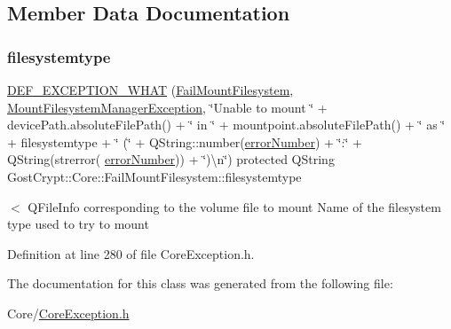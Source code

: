 \subsection{Member Data Documentation}
\mbox{\label{class_gost_crypt_1_1_core_1_1_fail_mount_filesystem_a73a764c0045dfdb4ad0f0229466b1fa0}} 
\subsubsection{\texorpdfstring{filesystemtype}{filesystemtype}}
{\footnotesize\ttfamily \hyperlink{_gost_crypt_exception_8h_a5bc1e1c6c9d6f46c84eeba49e33355f9}{D\+E\+F\+\_\+\+E\+X\+C\+E\+P\+T\+I\+O\+N\+\_\+\+W\+H\+AT} (\hyperlink{class_gost_crypt_1_1_core_1_1_fail_mount_filesystem}{Fail\+Mount\+Filesystem}, \hyperlink{class_gost_crypt_1_1_core_1_1_mount_filesystem_manager_exception}{Mount\+Filesystem\+Manager\+Exception}, \char`\"{}Unable to mount \char`\"{} + device\+Path.\+absolute\+File\+Path() + \char`\"{} in \char`\"{} + mountpoint.\+absolute\+File\+Path() + \char`\"{} as \char`\"{} + filesystemtype + \char`\"{} (\char`\"{} + Q\+String\+::number(\hyperlink{class_gost_crypt_1_1_core_1_1_mount_filesystem_manager_exception_a1fb5da5dbf91cfd3e664ffb9e2aee9ee}{error\+Number}) + \char`\"{}\+:\char`\"{} + Q\+String(strerror( \hyperlink{class_gost_crypt_1_1_core_1_1_mount_filesystem_manager_exception_a1fb5da5dbf91cfd3e664ffb9e2aee9ee}{error\+Number})) + \char`\"{})\textbackslash{}n\char`\"{}) protected Q\+String Gost\+Crypt\+::\+Core\+::\+Fail\+Mount\+Filesystem\+::filesystemtype}

$<$ Q\+File\+Info corresponding to the volume file to mount Name of the filesystem type used to try to mount 

Definition at line 280 of file Core\+Exception.\+h.



The documentation for this class was generated from the following file\+:\begin{DoxyCompactItemize}
\item 
Core/\hyperlink{_core_exception_8h}{Core\+Exception.\+h}\end{DoxyCompactItemize}
